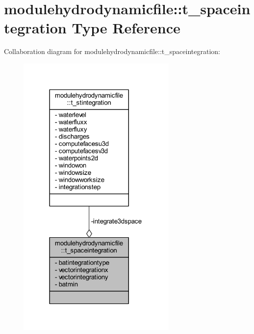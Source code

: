 \hypertarget{structmodulehydrodynamicfile_1_1t__spaceintegration}{}\section{modulehydrodynamicfile\+:\+:t\+\_\+spaceintegration Type Reference}
\label{structmodulehydrodynamicfile_1_1t__spaceintegration}


Collaboration diagram for modulehydrodynamicfile\+:\+:t\+\_\+spaceintegration\+:\nopagebreak
\begin{figure}[H]
\begin{center}
\leavevmode
\includegraphics[width=222pt]{structmodulehydrodynamicfile_1_1t__spaceintegration__coll__graph}
\end{center}
\end{figure}
